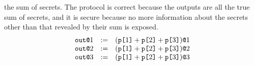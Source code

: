 the sum of secrets. The protocol is correct because the outputs are all the
true sum of secrets, and it is secure because no more information about the
secrets other than that revealed by their sum is exposed.
$$
\begin{array}{lll}
  \texttt{out}\texttt{@}1 &:=& (\texttt{p[}1\texttt{]} + \texttt{p[}2\texttt{]} + \texttt{p[}3\texttt{]})\texttt{@}1\\
  \texttt{out}\texttt{@}2 &:=& (\texttt{p[}1\texttt{]} + \texttt{p[}2\texttt{]} + \texttt{p[}3\texttt{]})\texttt{@}2\\
  \texttt{out}\texttt{@}3 &:=& (\texttt{p[}1\texttt{]} + \texttt{p[}2\texttt{]} + \texttt{p[}3\texttt{]})\texttt{@}3
\end{array}
$$

